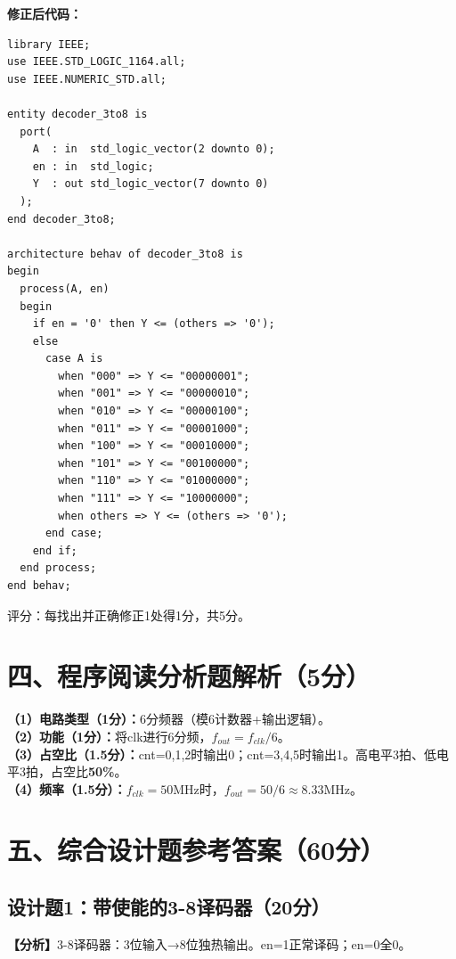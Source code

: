 \textbf{修正后代码：}
\begin{lstlisting}
library IEEE;
use IEEE.STD_LOGIC_1164.all;
use IEEE.NUMERIC_STD.all;

entity decoder_3to8 is
  port(
    A  : in  std_logic_vector(2 downto 0);
    en : in  std_logic;
    Y  : out std_logic_vector(7 downto 0)
  );
end decoder_3to8;

architecture behav of decoder_3to8 is
begin
  process(A, en)
  begin
    if en = '0' then Y <= (others => '0');
    else
      case A is
        when "000" => Y <= "00000001";
        when "001" => Y <= "00000010";
        when "010" => Y <= "00000100";
        when "011" => Y <= "00001000";
        when "100" => Y <= "00010000";
        when "101" => Y <= "00100000";
        when "110" => Y <= "01000000";
        when "111" => Y <= "10000000";
        when others => Y <= (others => '0');
      end case;
    end if;
  end process;
end behav;
\end{lstlisting}

{\centering 评分：每找出并正确修正1处得1分，共5分。\par}

\section{四、程序阅读分析题解析（5分）}

\textbf{（1）电路类型（1分）：}6分频器（模6计数器+输出逻辑）。\\
\textbf{（2）功能（1分）：}将clk进行6分频，$f_{out}=f_{clk}/6$。\\
\textbf{（3）占空比（1.5分）：}cnt=0,1,2时输出0；cnt=3,4,5时输出1。高电平3拍、低电平3拍，占空比\textbf{50\%}。\\
\textbf{（4）频率（1.5分）：}$f_{clk}=50\text{MHz}$时，$f_{out}=50/6\approx 8.33\text{MHz}$。

\section{五、综合设计题参考答案（60分）}

\subsection{设计题1：带使能的3-8译码器（20分）}

\textbf{【分析】}3-8译码器：3位输入→8位独热输出。en=1正常译码；en=0全0。

